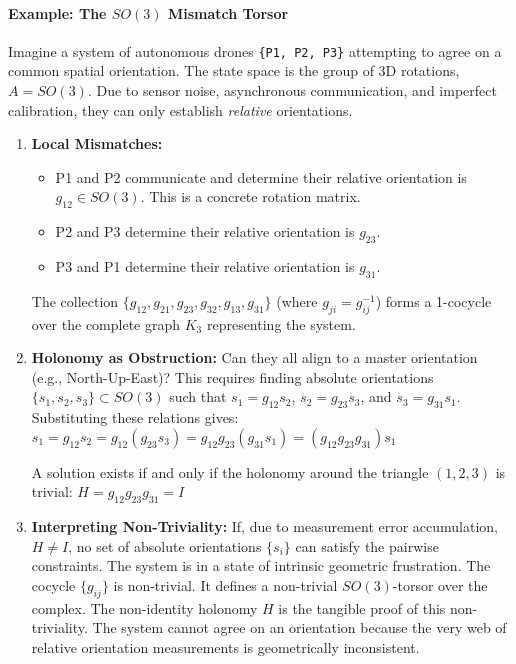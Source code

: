 \documentclass[
]{article}
\providecommand{\tightlist}{%
  \setlength{\itemsep}{0pt}\setlength{\parskip}{0pt}}
\begin{document}
\paragraph{\texorpdfstring{Example: The \(SO(3)\) Mismatch
Torsor}{Example: The SO(3) Mismatch Torsor}}\label{example-the-so3-mismatch-torsor}

Imagine a system of autonomous drones \texttt{\{P1,\ P2,\ P3\}}
attempting to agree on a common spatial orientation. The state space is
the group of 3D rotations, \(A = SO(3)\). Due to sensor noise,
asynchronous communication, and imperfect calibration, they can only
establish \emph{relative} orientations.

\begin{enumerate}
\def\labelenumi{\arabic{enumi}.}
\item
  \textbf{Local Mismatches:}

  \begin{itemize}
  \tightlist
  \item
    P1 and P2 communicate and determine their relative orientation is
    \(g_{12} \in SO(3)\). This is a concrete rotation matrix.
  \item
    P2 and P3 determine their relative orientation is \(g_{23}\).
  \item
    P3 and P1 determine their relative orientation is \(g_{31}\).
  \end{itemize}

  The collection \(\{g_{12}, g_{21}, g_{23}, g_{32}, g_{13}, g_{31}\}\)
  (where \(g_{ji}=g_{ij}^{-1}\)) forms a 1-cocycle over the complete
  graph \(K_3\) representing the system.
\item
  \textbf{Holonomy as Obstruction:} Can they all align to a master
  orientation (e.g., North-Up-East)? This requires finding absolute
  orientations \(\{s_1, s_2, s_3\} \subset SO(3)\) such that
  \(s_1 = g_{12} s_2\), \(s_2 = g_{23} s_3\), and \(s_3 = g_{31} s_1\).
  Substituting these relations gives:
  \(s_1 = g_{12} s_2 = g_{12} (g_{23} s_3) = g_{12} g_{23} (g_{31} s_1) = (g_{12} g_{23} g_{31}) s_1\)

  A solution exists if and only if the holonomy around the triangle
  \((1,2,3)\) is trivial: \(H = g_{12} g_{23} g_{31} = I\)
\item
  \textbf{Interpreting Non-Triviality:} If, due to measurement error
  accumulation, \(H \neq I\), no set of absolute orientations
  \(\{s_i\}\) can satisfy the pairwise constraints. The system is in a
  state of intrinsic geometric frustration. The cocycle \(\{g_{ij}\}\)
  is non-trivial. It defines a non-trivial \(SO(3)\)-torsor over the
  complex. The non-identity holonomy \(H\) is the tangible proof of this
  non-triviality. The system cannot agree on an orientation because the
  very web of relative orientation measurements is geometrically
  inconsistent.
\end{enumerate}
\end{document}
